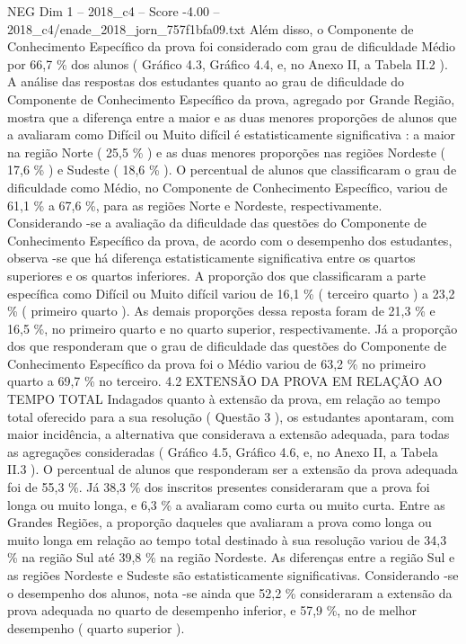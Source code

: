\begin{textsample}{NEG Dim 1 – 2018\_c4 – Score -4.00 – 2018\_c4/enade\_2018\_jorn\_757f1bfa09.txt}
Além disso, o Componente de Conhecimento Específico da prova foi considerado com grau de dificuldade Médio por 66,7 \% dos alunos ( Gráfico 4.3, Gráfico 4.4, e, no Anexo II, a Tabela II.2 ).
A análise das respostas dos estudantes quanto ao grau de dificuldade do Componente de Conhecimento Específico da prova, agregado por Grande Região, mostra que a diferença entre a maior e as duas menores proporções de alunos que a avaliaram como Difícil ou Muito difícil é estatisticamente significativa : a maior na região Norte ( 25,5 \% ) e as duas menores proporções nas regiões Nordeste ( 17,6 \% ) e Sudeste ( 18,6 \% ).
O percentual de alunos que classificaram o grau de dificuldade como Médio, no Componente de Conhecimento Específico, variou de 61,1 \% a 67,6 \%, para as regiões Norte e Nordeste, respectivamente.
Considerando -se a avaliação da dificuldade das questões do Componente de Conhecimento Específico da prova, de acordo com o desempenho dos estudantes, observa -se que há diferença estatisticamente significativa entre os quartos superiores e os quartos inferiores.
A proporção dos que classificaram a parte específica como Difícil ou Muito difícil variou de 16,1 \% ( terceiro quarto ) a 23,2 \% ( primeiro quarto ).
As demais proporções dessa reposta foram de 21,3 \% e 16,5 \%, no primeiro quarto e no quarto superior, respectivamente.
Já a proporção dos que responderam que o grau de dificuldade das questões do Componente de Conhecimento Específico da prova foi o Médio variou de 63,2 \% no primeiro quarto a 69,7 \% no terceiro. 4.2 EXTENSÃO DA PROVA EM RELAÇÃO AO TEMPO TOTAL Indagados quanto à extensão da prova, em relação ao tempo total oferecido para a sua resolução ( Questão 3 ), os estudantes apontaram, com maior incidência, a alternativa que considerava a extensão adequada, para todas as agregações consideradas ( Gráfico 4.5, Gráfico 4.6, e, no Anexo II, a Tabela II.3 ).
O percentual de alunos que responderam ser a extensão da prova adequada foi de 55,3 \%.
Já 38,3 \% dos inscritos presentes consideraram que a prova foi longa ou muito longa, e 6,3 \% a avaliaram como curta ou muito curta.
Entre as Grandes Regiões, a proporção daqueles que avaliaram a prova como longa ou muito longa em relação ao tempo total destinado à sua resolução variou de 34,3 \% na região Sul até 39,8 \% na região Nordeste.
As diferenças entre a região Sul e as regiões Nordeste e Sudeste são estatisticamente significativas.
Considerando -se o desempenho dos alunos, nota -se ainda que 52,2 \% consideraram a extensão da prova adequada no quarto de desempenho inferior, e 57,9 \%, no de melhor desempenho ( quarto superior ).

\end{textsample}
